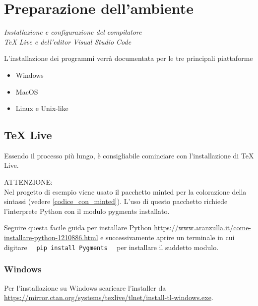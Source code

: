 \documentclass[envcountsame,envcountchap]{svmono}
\begin{document}
\chapter{Preparazione dell'ambiente} \label{Cap.1}

\vspace{2cm}

\begin{flushright}
\textit{Installazione e configurazione del compilatore\\ TeX Live e dell'editor Visual Studio Code}
\end{flushright}

\vspace{0.5cm}

L'installazione dei programmi verrà documentata per le tre principali piattaforme
\begin{itemize}
    \item Windows
    \item MacOS
    \item Linux e Unix-like
\end{itemize}

\section{TeX Live}\label{sezione}
Essendo il processo più lungo, è consigliabile cominciare con l'installazione di TeX Live.

ATTENZIONE:\\
Nel progetto di esempio viene usato il pacchetto minted per la colorazione della sintassi (vedere \ref{codice_con_minted}).\label{esempio_url}
L'uso di questo pacchetto richiede l'interprete Python con il modulo pygments installato.

Seguire questa facile guida per installare Python \url{https://www.aranzulla.it/come-installare-python-1210886.html} e 
successivamente aprire un terminale in cui digitare \ \ {\tt pip install Pygments} \ \ per installare il suddetto modulo.

\subsection{Windows}\label{sottosezione}
Per l'installazione su Windows scaricare l'installer da \url{https://mirror.ctan.org/systems/texlive/tlnet/install-tl-windows.exe}.
\end{document}
